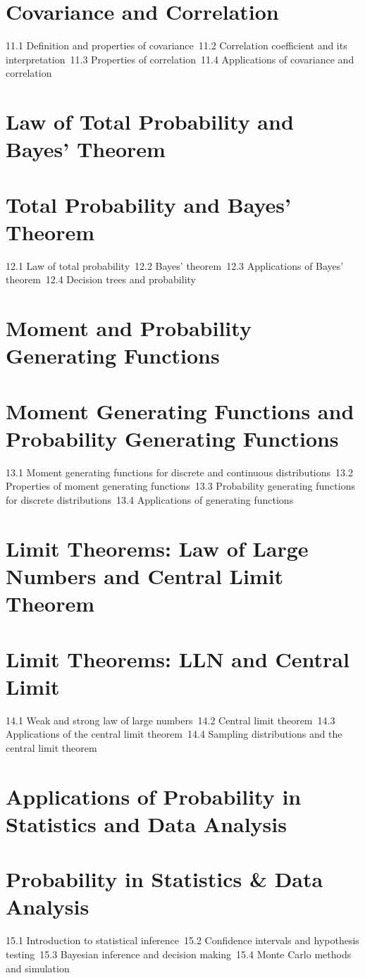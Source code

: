 \section{Covariance and Correlation}
11.1 Definition and properties of covariance\
11.2 Correlation coefficient and its interpretation\
11.3 Properties of correlation\
11.4 Applications of covariance and correlation\
\section{Law of Total Probability and Bayes' Theorem}
\section{Total Probability and Bayes' Theorem}
12.1 Law of total probability\
12.2 Bayes' theorem\
12.3 Applications of Bayes' theorem\
12.4 Decision trees and probability\
\section{Moment and Probability Generating Functions}
\section{Moment Generating Functions and Probability Generating Functions}
13.1 Moment generating functions for discrete and continuous distributions\
13.2 Properties of moment generating functions\
13.3 Probability generating functions for discrete distributions\
13.4 Applications of generating functions\
\section{Limit Theorems: Law of Large Numbers and Central Limit Theorem}
\section{Limit Theorems: LLN and Central Limit}
14.1 Weak and strong law of large numbers\
14.2 Central limit theorem\
14.3 Applications of the central limit theorem\
14.4 Sampling distributions and the central limit theorem\
\section{Applications of Probability in Statistics and Data Analysis}
\section{Probability in Statistics \& Data Analysis}
15.1 Introduction to statistical inference\
15.2 Confidence intervals and hypothesis testing\
15.3 Bayesian inference and decision making\
15.4 Monte Carlo methods and simulation\
